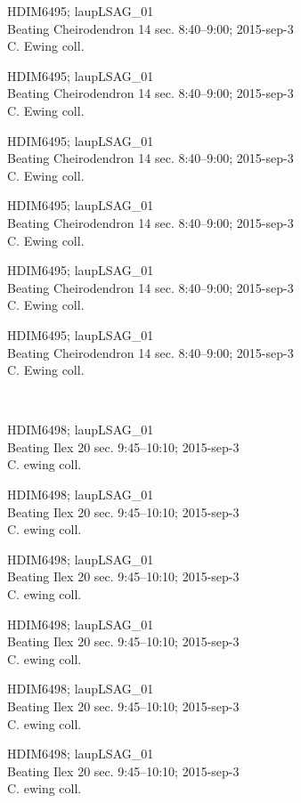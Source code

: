 \documentclass[2pt]{extarticle}
\begin{document}
\noindent
\parbox{0.16\textwidth}{\tiny \raggedright \rule[-0.3\baselineskip]{0pt}{10pt}HDIM6495; laupLSAG\_01\\ Beating Cheirodendron 14 sec. 8:40--9:00; 2015-sep-3\\ C. Ewing coll.}
\parbox{0.16\textwidth}{\tiny \raggedright \rule[-0.3\baselineskip]{0pt}{10pt}HDIM6495; laupLSAG\_01\\ Beating Cheirodendron 14 sec. 8:40--9:00; 2015-sep-3\\ C. Ewing coll.}
\parbox{0.16\textwidth}{\tiny \raggedright \rule[-0.3\baselineskip]{0pt}{10pt}HDIM6495; laupLSAG\_01\\ Beating Cheirodendron 14 sec. 8:40--9:00; 2015-sep-3\\ C. Ewing coll.}
\parbox{0.16\textwidth}{\tiny \raggedright \rule[-0.3\baselineskip]{0pt}{10pt}HDIM6495; laupLSAG\_01\\ Beating Cheirodendron 14 sec. 8:40--9:00; 2015-sep-3\\ C. Ewing coll.}
\parbox{0.16\textwidth}{\tiny \raggedright \rule[-0.3\baselineskip]{0pt}{10pt}HDIM6495; laupLSAG\_01\\ Beating Cheirodendron 14 sec. 8:40--9:00; 2015-sep-3\\ C. Ewing coll.}
\parbox{0.16\textwidth}{\tiny \raggedright \rule[-0.3\baselineskip]{0pt}{10pt}HDIM6495; laupLSAG\_01\\ Beating Cheirodendron 14 sec. 8:40--9:00; 2015-sep-3\\ C. Ewing coll.} \\ 
\vspace{0.001in} 

\noindent
\parbox{0.16\textwidth}{\tiny \raggedright \rule[-0.3\baselineskip]{0pt}{10pt}HDIM6498; laupLSAG\_01\\ Beating Ilex 20 sec. 9:45--10:10; 2015-sep-3\\ C. ewing coll.}
\parbox{0.16\textwidth}{\tiny \raggedright \rule[-0.3\baselineskip]{0pt}{10pt}HDIM6498; laupLSAG\_01\\ Beating Ilex 20 sec. 9:45--10:10; 2015-sep-3\\ C. ewing coll.}
\parbox{0.16\textwidth}{\tiny \raggedright \rule[-0.3\baselineskip]{0pt}{10pt}HDIM6498; laupLSAG\_01\\ Beating Ilex 20 sec. 9:45--10:10; 2015-sep-3\\ C. ewing coll.}
\parbox{0.16\textwidth}{\tiny \raggedright \rule[-0.3\baselineskip]{0pt}{10pt}HDIM6498; laupLSAG\_01\\ Beating Ilex 20 sec. 9:45--10:10; 2015-sep-3\\ C. ewing coll.}
\parbox{0.16\textwidth}{\tiny \raggedright \rule[-0.3\baselineskip]{0pt}{10pt}HDIM6498; laupLSAG\_01\\ Beating Ilex 20 sec. 9:45--10:10; 2015-sep-3\\ C. ewing coll.}
\parbox{0.16\textwidth}{\tiny \raggedright \rule[-0.3\baselineskip]{0pt}{10pt}HDIM6498; laupLSAG\_01\\ Beating Ilex 20 sec. 9:45--10:10; 2015-sep-3\\ C. ewing coll.} \\ 
\vspace{0.001in} 
\end{document}

